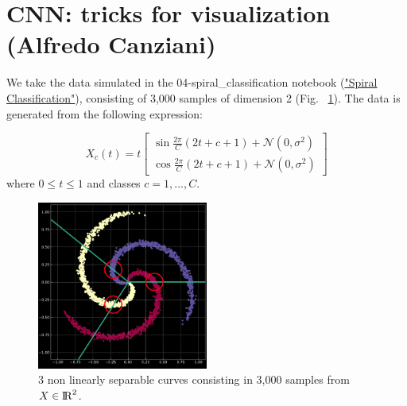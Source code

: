 
\section{CNN: tricks for visualization (Alfredo Canziani)}

We take the data simulated in the 04-spiral\_classification notebook (\href{https://github.com/Atcold/pytorch-Deep-Learning-Minicourse/blob/master/04-spiral\_classification.ipynb} {"Spiral Classification"}), 
consisting of 3,000 samples of dimension 2 (Fig. ~\ref{fig:NonLinearlySeparableParametricCurves2}). 
The data is generated from the following expression:

\[
X_c(t) = t
\begin{bmatrix}
    \sin{\frac{2\pi}{C} (2t+c+1) + \mathcal{N} (0, \sigma^2)} \\
    \cos{\frac{2\pi}{C} (2t+c+1) + \mathcal{N} (0, \sigma^2)}
\end{bmatrix}
\]
where $0 \leq t \leq 1$ and classes $c=1, ..., C$.


\begin{figure}[ht]
\centering
\includegraphics[width=0.5\textwidth]{lectures/04-a/images/NonLinearlySeparableParametricCurves.png}
\caption{3 non linearly separable curves consisting in 3,000 samples from $X \in {{\rm I\!R}}^2$.}
\label{fig:NonLinearlySeparableParametricCurves2}
\end{figure}

